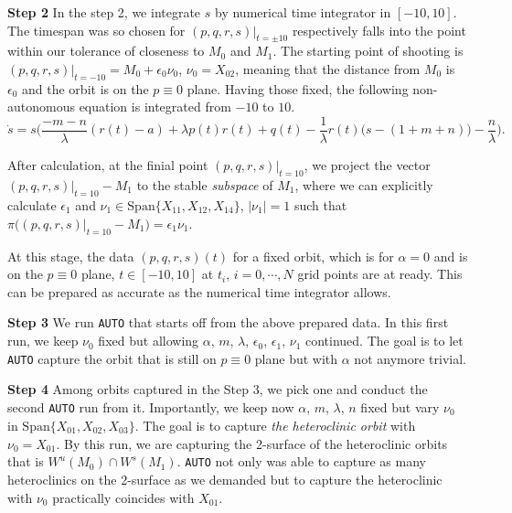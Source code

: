 \documentclass[a4paper,11pt]{article}
\theoremstyle{remark}
\begin{document}
{\bf \noindent Step 2}
In the step 2, we integrate $s$ by numerical time integrator in $[-10,10]$. The timespan was so chosen for $(p,q,r,s)|_{t=\pm10}$ respectively falls into the point within our tolerance of closeness to $M_0$ and $M_1$. The starting point of shooting is $(p,q,r,s)|_{t=-10} = M_0 + \epsilon_0 \nu_0$, $\nu_0 = X_{02}$, meaning that the distance from $M_0$ is $\epsilon_0$ and the orbit is on the $p\equiv0$ plane. Having those fixed, the following non-autonomous equation is integrated from $-10$ to $10$.
$$\dot{s} =s\Big(\frac{-m-n}{\lambda}(r(t)-a) + \lambda p(t)r(t) + q(t) - \frac{1}{\lambda}r(t)\big(s- (1+m+n)\big) - \frac{n}{\lambda}\Big).$$

After calculation, at the finial point $(p,q,r,s)|_{t=10}$, we project the vector $(p,q,r,s)|_{t=10}- M_1$ to the stable {\it subspace} of $M_1$, where we can explicitly calculate $\epsilon_1$ and $\nu_1 \in \underset{}{ \textrm{Span}}\{X_{11},X_{12},X_{14}\}$, $|\nu_1|=1$ such that
$\pi\big((p,q,r,s)|_{t=10}- M_1\big) =\epsilon_1 \nu_1$.

At this stage, the data $(p,q,r,s)(t)$ for a fixed orbit, which is for $\alpha=0$ and is on the $p\equiv0$ plane,  $t\in[-10,10]$ at $t_i$, $i=0,\cdots,N$ grid points are at ready. This can be prepared as accurate as the numerical time integrator allows. 

{\bf \noindent Step 3}
We run \texttt{AUTO} that starts off from the above prepared data. In this first run, we keep $\nu_0$ fixed but allowing $\alpha$, $m$, $\lambda$, $\epsilon_0$, $\epsilon_1$, $\nu_1$ continued.  The goal is to let \texttt{AUTO} capture the orbit that is still on $p\equiv0$ plane but with $\alpha$ not anymore trivial.

{\bf \noindent Step 4}
Among orbits captured in the Step 3, we pick one and conduct the second \texttt{AUTO} run from it. Importantly, we keep now $\alpha$, $m$, $\lambda$, $n$ fixed but vary $\nu_0$ in $\underset{}{ \textrm{Span}}\{X_{01},X_{02},X_{03}\}$. The goal is to capture {\it the heteroclinic orbit} with $\nu_0=X_{01}$. By this run, we are capturing the 2-surface of the heteroclinic orbits that is $W^u(M_0)\cap W^s(M_1)$. \texttt{AUTO} not only was able to capture as many heteroclinics on the 2-surface as we demanded but to capture the heteroclinic with $\nu_0$ practically coincides with $X_{01}$.

\pagebreak
\appendix
\renewcommand\thetheorem{\Alph{theorem}}
\setcounter{theorem}{\thetmp}
\end{document}
